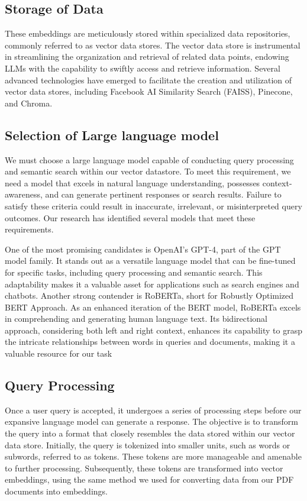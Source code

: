 \documentclass[conference]{IEEEtran}
\begin{document}
\subsection{Storage of Data}

These embeddings are meticulously stored within specialized data repositories, commonly referred to as vector data stores. The vector data store is instrumental in streamlining the organization and retrieval of related data points, endowing LLMs with the capability to swiftly access and retrieve information. Several advanced technologies have emerged to facilitate the creation and utilization of vector data stores, including Facebook AI Similarity Search (FAISS), Pinecone, and Chroma. 

\subsection{Selection of Large language model}
We must choose a large language model capable of conducting query processing and semantic search within our vector datastore. To meet this requirement, we need a model that excels in natural language understanding, possesses context-awareness, and can generate pertinent responses or search results. Failure to satisfy these criteria could result in inaccurate, irrelevant, or misinterpreted query outcomes. Our research has identified several models that meet these requirements.

One of the most promising candidates is OpenAI's GPT-4, part of the GPT model family. It stands out as a versatile language model that can be fine-tuned for specific tasks, including query processing and semantic search. This adaptability makes it a valuable asset for applications such as search engines and chatbots. Another strong contender is RoBERTa, short for Robustly Optimized BERT Approach. As an enhanced iteration of the BERT model, RoBERTa excels in comprehending and generating human language text. Its bidirectional approach, considering both left and right context, enhances its capability to grasp the intricate relationships between words in queries and documents, making it a valuable resource for our task

\subsection{Query Processing}
Once a user query is accepted, it undergoes a series of processing steps before our expansive language model can generate a response. The objective is to transform the query into a format that closely resembles the data stored within our vector data store. Initially, the query is tokenized into smaller units, such as words or subwords, referred to as tokens. These tokens are more manageable and amenable to further processing. Subsequently, these tokens are transformed into vector embeddings, using the same method we used for  converting data from our PDF documents into embeddings.
\end{document}
